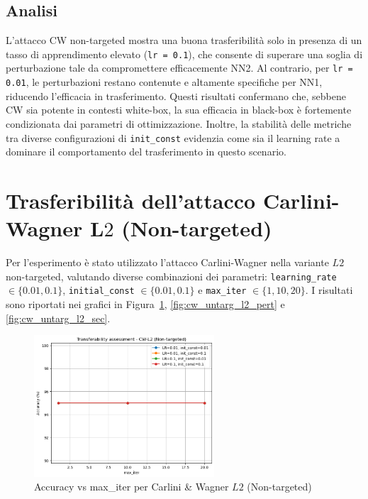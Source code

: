         \subsection{Analisi}
            L’attacco CW non-targeted mostra una buona trasferibilità solo in presenza di un tasso di apprendimento elevato (\texttt{lr = 0.1}), che consente di superare una soglia di perturbazione tale da compromettere efficacemente NN2. Al contrario, per \texttt{lr = 0.01}, le perturbazioni restano contenute e altamente specifiche per NN1, riducendo l’efficacia in trasferimento.
            Questi risultati confermano che, sebbene CW sia potente in contesti white-box, la sua efficacia in black-box è fortemente condizionata dai parametri di ottimizzazione. Inoltre, la stabilità delle metriche tra diverse configurazioni di \texttt{init\_const} evidenzia come sia il learning rate a dominare il comportamento del trasferimento in questo scenario.

    \section{Trasferibilità dell'attacco Carlini-Wagner L$2$ (Non-targeted)}
        Per l'esperimento è stato utilizzato l'attacco Carlini-Wagner nella variante $L2$ non-targeted, valutando diverse combinazioni dei parametri: \texttt{learning\_rate} $\in \{0.01, 0.1\}$, \texttt{initial\_const} $\in \{0.01, 0.1\}$ e \texttt{max\_iter} $\in \{1, 10, 20\}$. I risultati sono riportati nei grafici in Figura~\ref{fig:cw_untarg_l2_acc}, \ref{fig:cw_untarg_l2_pert} e \ref{fig:cw_untarg_l2_sec}.
        
        \begin{figure}[H]
            \centering
            \includegraphics[width=0.6\textwidth]{images/cwtrasuntargl2.png}
            \caption{Accuracy vs max\_iter per Carlini \& Wagner $L2$ (Non-targeted)}
            \label{fig:cw_untarg_l2_acc}
        \end{figure}
        
